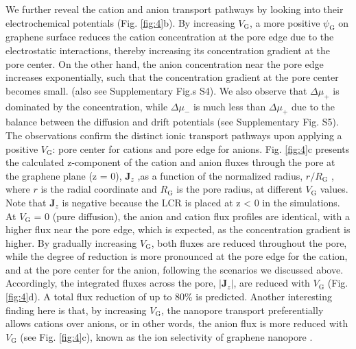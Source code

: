 \documentclass[journal=langd5,email=true, hyperref=true, keywords=false]{achemso}
\newcommand{\Fig}{Fig.}
\begin{document}
We further reveal the cation and anion transport pathways by looking
into their electrochemical potentials (\Fig{} \ref{fig:4}b). By
increasing $V_{\mathrm{G}}$, a more positive $\psi_{\mathrm{G}}$ on
graphene surface reduces the cation concentration at the pore edge due
to the electrostatic interactions, thereby increasing its
concentration gradient at the pore center. On the other hand, the
anion concentration near the pore edge increases exponentially, such
that the concentration gradient at the pore center becomes
small. (also see Supplementary \Fig{}s S4). We also
observe that $\Delta \mu_{+}$ is dominated by the concentration, while
$\Delta \mu_{-}$ is much less than $\Delta \mu_{+}$ due to the balance
between the diffusion and drift potentials (see Supplementary \Fig{}
S5). The observations confirm the distinct ionic
transport pathways upon applying a positive $V_{\mathrm{G}}$: pore
center for cations and pore edge for anions. \Fig{} \ref{fig:4}c
presents the calculated z-component of the cation and anion fluxes
through the pore at the graphene plane (z = 0), $\boldsymbol{J}_{z}$
,as a function of the normalized radius, $r/R_{\mathrm{G}}$ , where
$r$ is the radial coordinate and $R_{\mathrm{G}}$ is the pore radius,
at different $V_{\mathrm{G}}$ values. Note that $\boldsymbol{J}_{z}$
is negative because the LCR is placed at z < 0 in the simulations. At
$V_{\mathrm{G}}$ = 0 (pure diffusion), the anion and cation flux
profiles are identical, with a higher flux near the pore edge, which
is expected, as the concentration gradient is higher. By gradually
increasing $V_{\mathrm{G}}$, both fluxes are reduced throughout the
pore, while the degree of reduction is more pronounced at the pore
edge for the cation, and at the pore center for the anion, following
the scenarios we discussed above. Accordingly, the integrated fluxes
across the pore, $|\boldsymbol{J}_{z}|$, are reduced with
$V_{\mathrm{G}}$ (\Fig{} \ref{fig:4}d). A total flux reduction of up
to 80\% is predicted. Another interesting finding here is that, by
increasing $V_{\mathrm{G}}$, the nanopore transport preferentially
allows cations over anions, or in other words, the anion flux is more
reduced with $V_{\mathrm{G}}$ (see \Fig{} \ref{fig:4}c), known as the
ion selectivity of graphene nanopore \cite{Rollings_2016}.
\end{document}
